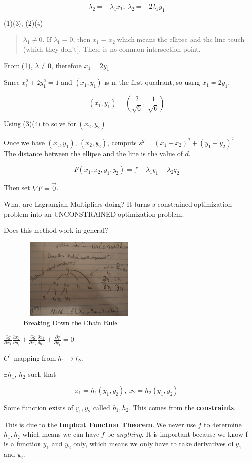 \documentclass[11pt]{article}
\begin{document}
\begin{enumerate}
$$
\lambda_2 = - \lambda_1 x_1, \ \lambda_2 = -2 \lambda_1 y_1
$$

(1)(3), (2)(4)

\begin{quote}
\(\lambda_1 \neq 0\). If \(\lambda_1 = 0\), then \(x_1 = x_2\) which means the ellipse
and the line touch (which they don't). There is no common intersection point.
\end{quote}

From (1), \(\lambda \neq 0\), therefore \(x_1 = 2 y_1\)


Since \(x_1^2 + 2 y_1^2 = 1\) and \((x_1, y_1)\) is in the first quadrant, so using
\(x_1 = 2 y_1\).

$$
(x_1, y_1) = (\frac{2}{\sqrt 6}, \ \frac{1}{\sqrt 6})
$$

Using (3)(4) to solve for \((x_2, y_2)\).

Once we have \((x_1, y_1), \ (x_2, y_2)\), compute \(s^2 = (x_1 - x_2)^2 + (y_1 -
y_2)^2\). The distance between the ellipse and the line is the value of \(d\).

$$
F(x_1, x_2, y_1, y_2) = f - \lambda_1 g_1 - \lambda_2 g_2
$$

Then set \(\nabla F = \vec 0\).

What are Lagrangian Multipliers doing? It turns a constrained optimization
problem into an UNCONSTRAINED optimization problem.

Does this method work in general?

\begin{figure}[htbp]
\centering
\includegraphics[width=6cm,height=4cm]{./resources/chain_rule.jpg}
\caption{\label{fig:org66344c6}Breaking Down the Chain Rule}
\end{figure}

\(\frac{\partial g}{\partial x_1} \frac{\partial x_2}{\partial y_1} + \frac{\partial g}{\partial x_2} \frac{\partial x_2}{\partial y_1} + \frac{\partial g}{\partial y_1} = 0\)

\(C^1\) mapping from \(h_1 \to h_2\).

\(\exists h_1, \ h_2\) such that

$$
x_1 = h_1 (y_1, y_2), \ x_2 = h_2 (y_1, y_2)
$$

Some function exists of \(y_1, y_2\) called \(h_1, h_2\). This comes from the \textbf{constraints}.

This is due to the \textbf{Implicit Function Theorem}. We never use \(f\) to determine
\(h_1, h_2\) which means we can have \(f\) be \emph{anything}. It is important because we
know f is a function \(y_1\) and \(y_2\) only, which means we only have to take
derivatives of \(y_1\) and \(y_2\).
\end{enumerate}
\end{document}

